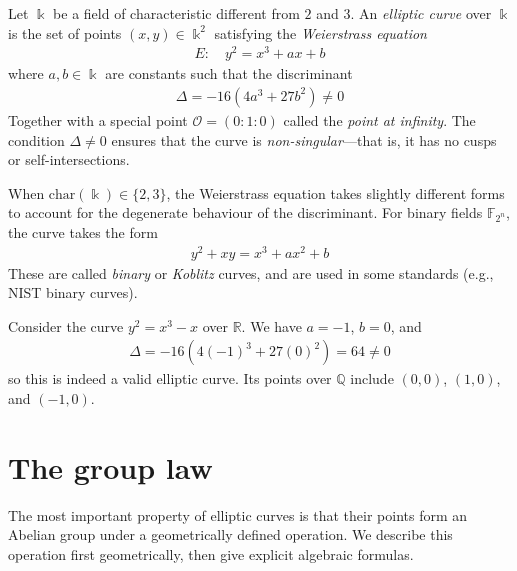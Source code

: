 \documentclass[a4paper, 12pt]{book} %
\begin{document}
\begin{definition}
    Let $\Bbbk$ be a field of characteristic different from $2$ and $3$. An \emph{elliptic curve} over $\Bbbk$ is the set of points $(x, y) \in \Bbbk^2$ satisfying the \emph{Weierstrass equation}
    \begin{align}
        E: \quad y^2 = x^3 + ax + b
    \end{align}
    where $a, b \in \Bbbk$ are constants such that the discriminant
    \begin{align}
        \Delta = -16(4a^3 + 27b^2) \neq 0
    \end{align}
    Together with a special point $\mathcal{O} = (0:1:0)$ called the \emph{point at infinity}. The condition $\Delta \neq 0$ ensures that the curve is \emph{non-singular}---that is, it has no cusps or self-intersections.
\end{definition}

\begin{remark}
    When $\mathrm{char}(\Bbbk) \in \{2, 3\}$, the Weierstrass equation takes slightly different forms to account for the degenerate behaviour of the discriminant. For binary fields $\mathbb{F}_{2^n}$, the curve takes the form
    \begin{align}
        y^2 + xy = x^3 + ax^2 + b
    \end{align}
    These are called \emph{binary} or \emph{Koblitz} curves, and are used in some standards (e.g., NIST binary curves).
\end{remark}

\begin{example}
    Consider the curve $y^2 = x^3 - x$ over $\mathbb{R}$. We have $a = -1$, $b = 0$, and
    \begin{align}
        \Delta = -16(4(-1)^3 + 27(0)^2) = 64 \neq 0
    \end{align}
    so this is indeed a valid elliptic curve. Its points over $\mathbb{Q}$ include $(0,0)$, $(1,0)$, and $(-1,0)$.
\end{example}

\section{The group law}

The most important property of elliptic curves is that their points form an
Abelian group under a geometrically defined operation. We describe this
operation first geometrically, then give explicit algebraic formulas.
\end{document}
